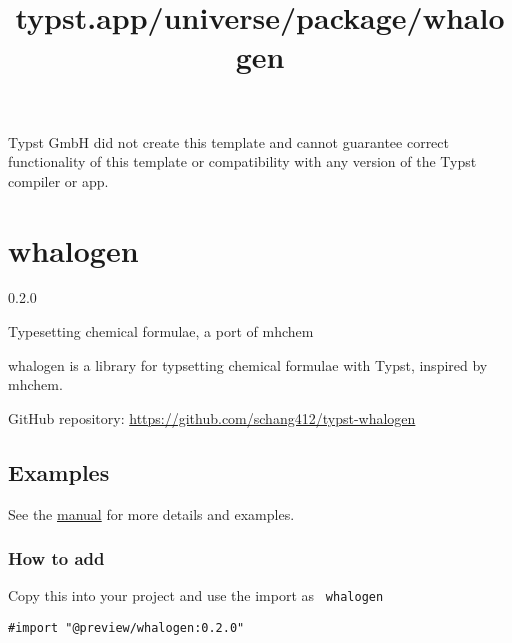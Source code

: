 Typst GmbH did not create this template and cannot guarantee correct
functionality of this template or compatibility with any version of the
Typst compiler or app.


\title{typst.app/universe/package/whalogen}

\label{banner}
\section{whalogen}\label{whalogen}

{ 0.2.0 }

Typesetting chemical formulae, a port of mhchem

\label{readme}
whalogen is a library for typsetting chemical formulae with Typst,
inspired by mhchem.

GitHub repository: \url{https://github.com/schang412/typst-whalogen}

\subsection{Examples}\label{examples}


\begin{Shaded}
\begin{Highlighting}[]

\end{Highlighting}
\end{Shaded}

See the
\href{https://github.com/typst/packages/raw/main/packages/preview/whalogen/0.2.0/manual.pdf}{manual}
for more details and examples.

\subsubsection{How to add}\label{how-to-add}

Copy this into your project and use the import as \texttt{\ whalogen\ }

\begin{verbatim}
#import "@preview/whalogen:0.2.0"
\end{verbatim}



